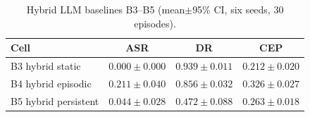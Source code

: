 \begin{table}[!t]
\caption{Hybrid LLM baselines B3--B5 (mean$\pm$95\% CI, six seeds, 30 episodes).}
\label{tab:llm}
\centering
\begin{tabular}{@{}lccc@{}}
\toprule
\textbf{Cell} & \textbf{ASR} & \textbf{DR} & \textbf{CEP} \\
\midrule
B3 hybrid static       & $0.000{\pm}0.000$ & $0.939{\pm}0.011$ & $0.212{\pm}0.020$ \\
B4 hybrid episodic     & $0.211{\pm}0.040$ & $0.856{\pm}0.032$ & $0.326{\pm}0.027$ \\
B5 hybrid persistent   & $0.044{\pm}0.028$ & $0.472{\pm}0.088$ & $0.263{\pm}0.018$ \\
\bottomrule
\end{tabular}
\end{table}
